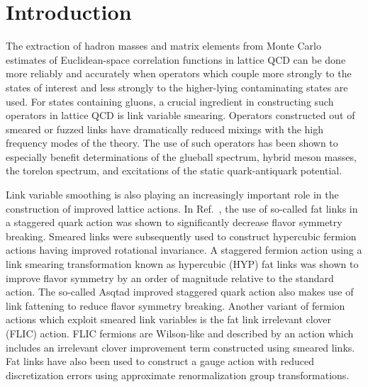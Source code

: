 \section{Introduction}
The extraction of hadron masses and matrix elements from
Monte Carlo estimates of Euclidean-space correlation functions
in lattice QCD can be done more reliably and accurately when
operators which couple more strongly to the states of interest
and less strongly to the higher-lying contaminating states
are used.  For states containing gluons, a crucial ingredient
in constructing such operators in lattice QCD is link
variable smearing.  Operators constructed out of
smeared or fuzzed links have dramatically reduced mixings with
the high frequency modes of the theory.  The use of such operators
has been shown to especially benefit determinations of the
glueball spectrum\cite{colin2}, hybrid meson masses\cite{hybrids,jkm1},
the torelon spectrum\cite{torelons}, and excitations of the static
quark-antiquark potential\cite{jkm2}.

Link variable smoothing is also playing an increasingly important
role in the construction of improved lattice actions.  In Ref.~\cite{fat1},
the use of so-called fat links in a staggered quark action was shown
to significantly decrease flavor symmetry breaking.
Smeared links were subsequently used\cite{fat2} to construct hypercubic
fermion actions having improved rotational invariance.
A staggered fermion action using a link smearing transformation\cite{hyp}
known as hypercubic (HYP) fat links was shown to improve flavor symmetry
by an order of magnitude relative to the standard action.
The so-called Asqtad improved staggered 
quark action\cite{asqtad1,asqtad2,asqtad3}
also makes use of link fattening to reduce flavor symmetry breaking.
Another variant of fermion actions which exploit smeared link variables
is the fat link irrelevant clover (FLIC) action\cite{flic}.
FLIC fermions are Wilson-like and described by an action which
includes an irrelevant clover improvement term constructed using
smeared links.  Fat links have also been used to construct a
gauge action\cite{fatgauge} with reduced discretization errors using
approximate renormalization group transformations.

